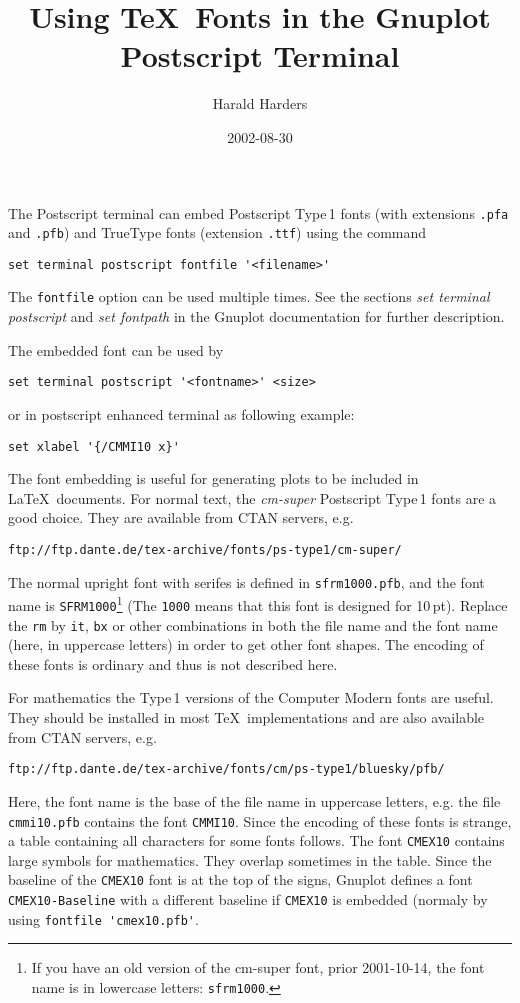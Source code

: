 \documentclass[a4paper,10pt]{article}
\begin{document}
\title{Using \TeX\ Fonts in the Gnuplot Postscript Terminal}
\author{Harald Harders}
\date{2002-08-30}
\maketitle

The Postscript terminal can embed Postscript Type\,1 fonts (with
extensions \verb|.pfa| and \verb|.pfb|) and TrueType fonts (extension
\verb|.ttf|) using the command
\begin{verbatim}
set terminal postscript fontfile '<filename>'
\end{verbatim}
The \verb|fontfile| option can be used multiple times.
See the sections \emph{set terminal postscript} and \emph{set
  fontpath} in the Gnuplot documentation for further description.

The embedded font can be used by 
\begin{verbatim}
set terminal postscript '<fontname>' <size>
\end{verbatim}
or in postscript enhanced terminal as following example:
\begin{verbatim}
set xlabel '{/CMMI10 x}'
\end{verbatim}

The font embedding is useful for generating plots to be included in
\LaTeX\ documents. 
For normal text, the \emph{cm-super} Postscript Type\,1 fonts are a
good choice. 
They are available from CTAN servers, e.g.
\begin{verbatim}
ftp://ftp.dante.de/tex-archive/fonts/ps-type1/cm-super/
\end{verbatim}
The normal upright font with serifes is defined in
\verb|sfrm1000.pfb|, and the font name is \verb|SFRM1000|\footnote{If you
have an old version of the cm-super font, prior 2001-10-14, the font name is
in lowercase letters: \texttt{sfrm1000}.} (The
\verb|1000| means that this font is designed for 10\,pt).
Replace the \verb|rm| by \verb|it|, \verb|bx| or other combinations in
both the file name and the font name (here, in uppercase letters) in order 
to get other font shapes.
The encoding of these fonts is ordinary and thus is not described here.

For mathematics the Type\,1 versions of the Computer Modern fonts are
useful.
They should be installed in most \TeX\ implementations and are also
available from CTAN servers, e.g.
\begin{verbatim}
ftp://ftp.dante.de/tex-archive/fonts/cm/ps-type1/bluesky/pfb/
\end{verbatim}
Here, the font name is the base of the file name in uppercase letters,
e.g. the file \verb|cmmi10.pfb| contains the font \verb|CMMI10|.
Since the encoding of these fonts is strange, a table containing all
characters for some fonts follows.
The font \verb|CMEX10| contains large symbols for mathematics. They
overlap sometimes in the table. Since the baseline of the
\verb|CMEX10| font is at the top of the signs, Gnuplot defines a font
\verb|CMEX10-Baseline| with a different baseline if \verb|CMEX10| is
embedded (normaly by using \verb|fontfile 'cmex10.pfb'|.
\end{document}
